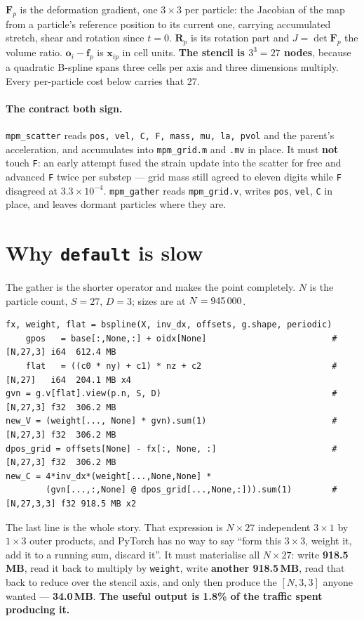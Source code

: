 \documentclass[11pt,a4paper]{article}
\newcommand{\code}[1]{\texttt{\small #1}}
\newcommand{\gd}[1]{\textcolor{good}{\textbf{#1}}}
\begin{document}
$\mathbf{F}_p$ is the deformation gradient, one $3{\times}3$ per particle: the Jacobian of the map
from a particle's reference position to its current one, carrying accumulated stretch, shear and
rotation since $t=0$. $\mathbf{R}_p$ is its rotation part and $J=\det\mathbf{F}_p$ the volume ratio.
$\mathbf{o}_i-\mathbf{f}_p$ is $\mathbf{x}_{ip}$ in cell units. \textbf{The stencil is $3^3=27$
nodes}, because a quadratic B-spline spans three cells per axis and three dimensions multiply. Every
per-particle cost below carries that 27.

\paragraph{The contract both sign.} \code{mpm\_scatter} reads \code{pos, vel, C, F, mass, mu, la,
pvol} and the parent's acceleration, and accumulates into \code{mpm\_grid.m} and \code{.mv} in place.
It must \textbf{not} touch \code{F}: an early attempt fused the strain update into the scatter for
free and advanced \code{F} twice per substep --- grid mass still agreed to eleven digits while
\code{F} disagreed at $3.3\times10^{-4}$. \code{mpm\_gather} reads \code{mpm\_grid.v}, writes
\code{pos}, \code{vel}, \code{C} in place, and leaves dormant particles where they are.

\section{Why \code{default} is slow}

The gather is the shorter operator and makes the point completely. $N$ is the particle count,
$S=27$, $D=3$; sizes are at $N=945\,000$.

\begin{lstlisting}[numbers=none]
fx, weight, flat = bspline(X, inv_dx, offsets, g.shape, periodic)
    gpos   = base[:,None,:] + oidx[None]                         # [N,27,3] i64  612.4 MB
    flat   = ((c0 * ny) + c1) * nz + c2                          # [N,27]   i64  204.1 MB x4
gvn = g.v[flat].view(p.n, S, D)                                  # [N,27,3] f32  306.2 MB
new_V = (weight[..., None] * gvn).sum(1)                         # [N,27,3] f32  306.2 MB
dpos_grid = offsets[None] - fx[:, None, :]                       # [N,27,3] f32  306.2 MB
new_C = 4*inv_dx*(weight[...,None,None] *
        (gvn[...,:,None] @ dpos_grid[...,None,:])).sum(1)        # [N,27,3,3] f32 918.5 MB x2
\end{lstlisting}

\noindent
The last line is the whole story. That expression is $N\times27$ independent $3{\times}1$ by
$1{\times}3$ outer products, and PyTorch has no way to say ``form this $3{\times}3$, weight it, add
it to a running sum, discard it''. It must materialise all $N\times27$: write \gd{918.5\,MB}, read it
back to multiply by \code{weight}, write \gd{another 918.5\,MB}, read that back to reduce over the
stencil axis, and only then produce the $[N,3,3]$ anyone wanted --- \gd{34.0\,MB}. \textbf{The useful
output is 1.8\% of the traffic spent producing it.}
\end{document}
